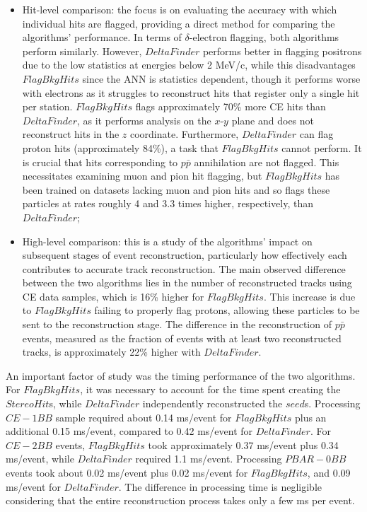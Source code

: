\begin{itemize}
    \item Hit-level comparison: the focus is on evaluating the 
    accuracy with which individual hits are flagged, providing a 
    direct method for comparing the algorithms' performance. In terms 
    of $\delta$-electron flagging, both algorithms perform similarly. 
    However, $DeltaFinder$ performs better in flagging positrons 
    due to the low statistics at energies below 2 MeV/c, 
    while this disadvantages $FlagBkgHits$ since the ANN is 
    statistics dependent, though it 
    performs worse with electrons as it struggles to reconstruct hits 
    that register only a single hit per station.  
    $FlagBkgHits$ flags approximately 70\% more CE hits than 
    $DeltaFinder$, as it performs analysis on the $x$-$y$ plane and does 
    not reconstruct hits in the $z$ coordinate. Furthermore, 
    $DeltaFinder$ can flag proton hits (approximately 84\%), 
    a task that $FlagBkgHits$ cannot perform. It is crucial that hits 
    corresponding to $p\bar{p}$ annihilation are not flagged. This necessitates 
    examining muon and pion hit flagging, but $FlagBkgHits$ has been trained 
    on datasets lacking muon and pion hits and so 
    flags these particles at rates roughly 4 and 3.3 times higher, 
    respectively, than $DeltaFinder$;
    
    \item High-level comparison: this is a study of the algorithms' 
    impact on subsequent stages of event reconstruction, particularly 
    how effectively each contributes to accurate track reconstruction. 
    The main observed difference between the two algorithms lies in the number 
    of reconstructed tracks using CE data samples, which is 16\% higher 
    for $FlagBkgHits$. This increase is due to $FlagBkgHits$ failing to 
    properly flag protons, allowing these particles to be sent to the 
    reconstruction stage. The difference in the reconstruction of 
    $p\bar{p}$ events, measured as the fraction of events with 
    at least two reconstructed tracks, is approximately 22\% higher with $DeltaFinder$.
\end{itemize}
An important factor of study was the timing performance of the 
two algorithms. For $FlagBkgHits$, it was necessary to account for the time 
spent creating the $StereoHit$s, while $DeltaFinder$ independently 
reconstructed the $seed$s. Processing $CE-1BB$ sample required about 
0.14 ms/event for $FlagBkgHits$ plus an additional 0.15 ms/event, 
compared to 0.42 ms/event for $DeltaFinder$. For $CE-2BB$ events, 
$FlagBkgHits$ took approximately 0.37 ms/event plus 0.34 ms/event, 
while $DeltaFinder$ required 1.1 ms/event. Processing $PBAR-0BB$ 
events took about 0.02 ms/event plus 0.02 ms/event for $FlagBkgHits$, 
and 0.09 ms/event for $DeltaFinder$. The difference in processing time 
is negligible considering that the entire reconstruction process 
takes only a few ms per event.

